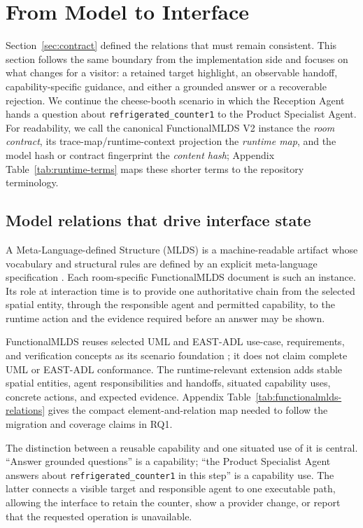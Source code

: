\section{From Model to Interface}
\label{sec:implementation}

Section~\ref{sec:contract} defined the relations that must remain consistent.
This section follows the same boundary from the implementation side and focuses
on what changes for a visitor: a retained target highlight, an observable
handoff, capability-specific guidance, and either a grounded answer or a
recoverable rejection.  We continue the cheese-booth scenario in which the
Reception Agent hands a question about \texttt{refrigerated\_counter1} to the
Product Specialist Agent.  For readability, we call the canonical
FunctionalMLDS V2 instance the \emph{room contract}, its
trace-map/runtime-context projection the \emph{runtime map}, and the model hash
or contract fingerprint the \emph{content hash}; Appendix
Table~\ref{tab:runtime-terms} maps these shorter terms to the repository
terminology.

\subsection{Model relations that drive interface state}

A Meta-Language-defined Structure (MLDS) is a machine-readable artifact whose
vocabulary and structural rules are defined by an explicit meta-language
specification \cite{fischer2025machinereadable}.  Each room-specific
FunctionalMLDS document is such an instance.  Its role at interaction time is
to provide one authoritative chain from the selected spatial entity, through
the responsible agent and permitted capability, to the runtime action and the
evidence required before an answer may be shown.

FunctionalMLDS reuses selected UML and EAST-ADL use-case, requirements, and
verification concepts as its scenario foundation \cite{eastadl2013spec}; it
does not claim complete UML or EAST-ADL conformance.  The runtime-relevant
extension adds stable spatial entities, agent responsibilities and handoffs,
situated capability uses, concrete actions, and expected evidence.  Appendix
Table~\ref{tab:functionalmlds-relations} gives the compact element-and-relation
map needed to follow the migration and coverage claims in RQ1.

The distinction between a reusable capability and one situated use of it is
central.  ``Answer grounded questions'' is a capability; ``the Product
Specialist Agent answers about \texttt{refrigerated\_counter1} in this step''
is a capability use.  The latter connects a visible target and responsible
agent to one executable path, allowing the interface to retain the counter,
show a provider change, or report that the requested operation is unavailable.

